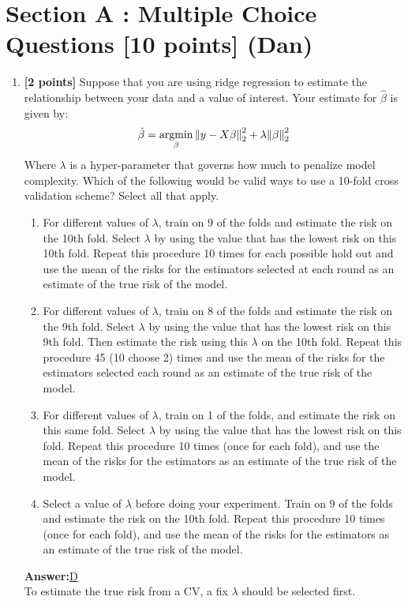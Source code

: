 
\section*{Section A : Multiple Choice Questions [10 points] (Dan)}

\begin{enumerate}
	\item {\textbf{[2 points]} Suppose that you are using ridge regression to estimate the relationship between your data and a value of interest. Your estimate for $\hat{\beta}$ is given by:
	$$\hat{\beta} = \operatorname*{\mathrm{argmin}}_\beta \norm{y - X \beta}_2^2 + \lambda \norm{\beta}_2^2$$
	Where $\lambda$ is a hyper-parameter that governs how much to penalize model complexity. Which of the following would be valid ways to use a 10-fold cross validation scheme? Select all that apply.
	}
	\begin{enumerate}[label=\Alph*)]
			\item {
				 For different values of $\lambda$, train on 9 of the folds and estimate the risk on the 10th fold. Select $\lambda$ by using the value that has the lowest risk on this 10th fold. Repeat this procedure 10 times for each possible hold out and use the mean of the risks for the estimators selected at each round as an estimate of the true risk of the model.
			}
			\item {
				 For different values of $\lambda$, train on 8 of the folds and estimate the risk on the 9th fold. Select $\lambda$ by using the value that has the lowest risk on this 9th fold. Then estimate the risk using this $\lambda$ on the 10th fold. Repeat this procedure 45 (10 choose 2) times and use the mean of the risks for the estimators selected each round as an estimate of the true risk of the model.
			}
			\item {
				 For different values of $\lambda$, train on 1 of the folds, and estimate the risk on this same fold. Select $\lambda$ by using the value that has the lowest risk on this fold. Repeat this procedure 10 times (once for each fold), and use the mean of the risks for the estimators as an estimate of the true risk of the model.
			}
			\item {
				 Select a value of $\lambda$ before doing your experiment. Train on 9 of the folds and estimate the risk on the 10th fold. Repeat this procedure 10 times (once for each fold), and use the mean of the risks for the estimators as an estimate of the true risk of the model.
			}
	\end{enumerate}
	\textbf{Answer:}\underline{D}\\
	To estimate the true risk from a CV, a fix $\lambda$ should be selected first.
	

\end{enumerate}
